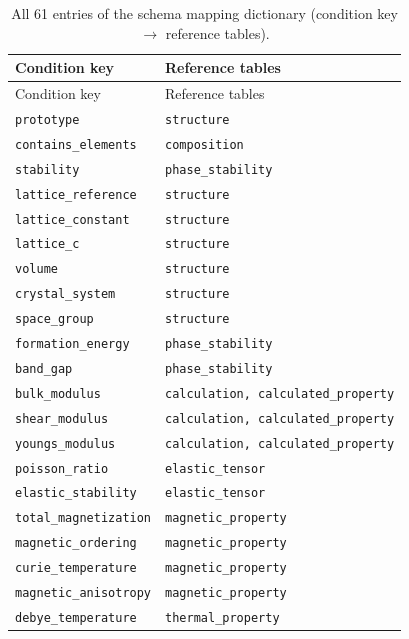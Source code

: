 \begin{footnotesize}
\begin{longtable}{ll}
  \caption{All 61 entries of the schema mapping dictionary (condition key $\to$ reference tables).}
  \label{tab:schema_map_dict} \\
  \toprule
  Condition key & Reference tables \\
  \midrule
  \endfirsthead
  \toprule
  Condition key & Reference tables \\
  \midrule
  \endhead
  \bottomrule
  \endfoot
    \texttt{prototype} & \texttt{structure} \\
    \texttt{contains\_elements} & \texttt{composition} \\
    \texttt{stability} & \texttt{phase\_stability} \\
    \texttt{lattice\_reference} & \texttt{structure} \\
    \texttt{lattice\_constant} & \texttt{structure} \\
    \texttt{lattice\_c} & \texttt{structure} \\
    \texttt{volume} & \texttt{structure} \\
    \texttt{crystal\_system} & \texttt{structure} \\
    \texttt{space\_group} & \texttt{structure} \\
    \texttt{formation\_energy} & \texttt{phase\_stability} \\
    \texttt{band\_gap} & \texttt{phase\_stability} \\
    \texttt{bulk\_modulus} & \texttt{calculation, calculated\_property} \\
    \texttt{shear\_modulus} & \texttt{calculation, calculated\_property} \\
    \texttt{youngs\_modulus} & \texttt{calculation, calculated\_property} \\
    \texttt{poisson\_ratio} & \texttt{elastic\_tensor} \\
    \texttt{elastic\_stability} & \texttt{elastic\_tensor} \\
    \texttt{total\_magnetization} & \texttt{magnetic\_property} \\
    \texttt{magnetic\_ordering} & \texttt{magnetic\_property} \\
    \texttt{curie\_temperature} & \texttt{magnetic\_property} \\
    \texttt{magnetic\_anisotropy} & \texttt{magnetic\_property} \\
    \texttt{debye\_temperature} & \texttt{thermal\_property} \\

\end{longtable}
\end{footnotesize}

